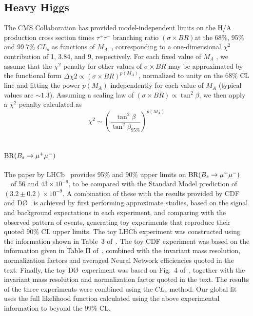 \documentclass[cits]{PoS}
\newcommand{\br}{{\rm BR}}
\newcommand{\bmm}{\ensuremath{\br(B_s \to \mu^+\mu^-)}\ }
\begin{document}
\subsection{Heavy Higgs}
The CMS Collaboration has provided model-independent limits on the H/A
production cross section times $\tau^{+}\tau^{-}$ branching ratio $(\sigma\times
BR)$at the 68\%, 95\% and 99.7\% $CL_{s}$ as functions of $M_{A}$~\cite{nikitenko}, corresponding 
to a one-dimensional $\chi^{2}$ contribution of 1, 3.84, and 9, respectively. For 
each fixed value of $M_{A}$ , we assume that the $\chi^{2}$ penalty for other values of
$\sigma\times BR$ may be approximated by the functional form 
$\Delta\chi{2}\propto (\sigma\times BR)^{p(M_{A})}$, normalized to unity on the 
68\% CL line and fitting the power $p(M_{A})$ independently for each value of
$M_{A}$ (typical values are $\sim 1.3$). Assuming a scaling law of
$\left(\sigma\times BR\right)\propto \tan^{2}\beta$, we then apply a $\chi^{2}$ penalty 
calculated as
\begin{equation}
    \chi^{2}\sim\left(\frac{\tan^{2}\beta}{\tan^{2}\beta_{95\%}} \right)^{p\left(M_{A}\right)}
\end{equation}

\subsection{\bmm}
The paper by LHCb~\cite{lhcb-bmm} provides 95\% and 90\% upper limits on
\bmm\ of 56 and $43 \times 10^{-9}$,
to be compared with the Standard Model prediction of
$(3.2 \pm 0.2) \times 10^{-9}$.
A combination of these with the results provided by CDF~\cite{cdf-bmm} and D\O~\cite{d0-bmm}
is achieved by first performing approximate studies, based on the signal and background expectations in each experiment, and comparing
with the observed pattern of events, generating toy experiments that reproduce their quoted 90\% CL upper limits.
The toy LHCb experiment was constructed using the information shown in Table~3 of~\cite{lhcb-bmm}.
The toy CDF experiment was based on the information given in Table II of~\cite{cdf-bmm},
combined with the invariant mass resolution, normalization factors and averaged 
Neural Network efficiencies quoted in the text. 
Finally, the toy D\O\ experiment was based on Fig.~4 of~\cite{d0-bmm}, together with
the invariant mass resolution and normalization factor quoted in the text.
The results of the three experiments were combined using the $CL_{s}$ method.
Our global fit uses the full likelihood function calculated using the above
experimental information to beyond the 99\% CL.
\end{document}
